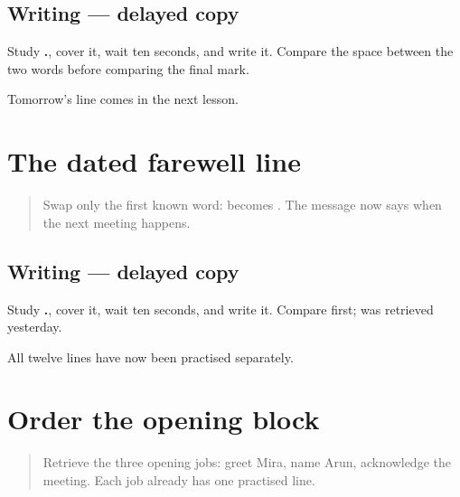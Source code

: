 \subsection*{Writing — delayed copy}
Study \textbf{ .}, cover it, wait ten seconds, and write it. Compare the space between the two words before comparing the final mark.

\begin{tcolorbox}[breakable,colback=teal!4,colframe=teal!35!black,title={Before you move on}]
Tomorrow's line comes in the next lesson.
\end{tcolorbox}
\section[\texorpdfstring{\mr{उद्या} \mr{भेटू}. (udyā bheṭū)}{उद्या भेटू. (udyā bheṭū)}]{The dated farewell line}

\label{lesson:MR-A1M12-tomorrow-line}



\begin{quote}
Swap only the first known word: \textbf{ } becomes \textbf{ }. The message now says when the next meeting happens.
\end{quote}

\subsection*{Writing — delayed copy}
Study \textbf{ .}, cover it, wait ten seconds, and write it. Compare \textbf{} first; \textbf{} was retrieved yesterday.

\begin{tcolorbox}[breakable,colback=teal!4,colframe=teal!35!black,title={Before you move on}]
All twelve lines have now been practised separately.
\end{tcolorbox}
\section[opening block]{Order the opening block}

\label{lesson:MR-A1M13-opening-block}



\begin{quote}
Retrieve the three opening jobs: greet Mira, name Arun, acknowledge the meeting. Each job already has one practised line.
\end{quote}


